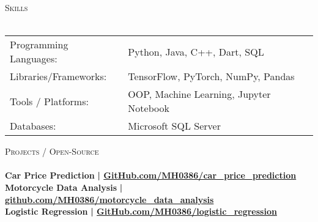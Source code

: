 \documentclass[a4paper]{article}
\newcommand{\lineunder} {
    \vspace*{-8pt} \\
    \hspace*{-18pt} \hrulefill \\
}
\newcommand{\header} [1] {
    {\hspace*{-18pt}\vspace*{6pt} \textsc{#1}}
    \vspace*{-6pt} \lineunder
}
\begin{document}
%
%
  \header{Skills}
  \vspace{2mm}
  \begin{longtable}{p{4cm}p{12cm}}
  Programming Languages: & Python, Java, C++, Dart, SQL \\
  Libraries/Frameworks: & TensorFlow, PyTorch, NumPy, Pandas \\
  Tools / Platforms: & OOP, Machine Learning, Jupyter Notebook \\
  Databases: & Microsoft SQL Server \\
  \end{longtable}
  \vspace{1mm}

      \header{Projects / Open-Source}
\vspace{2mm}
      {\textbf{Car Price Prediction}}\textbf{ | \href{https://github.com/MH0386/car\_price\_prediction}{GitHub.com/MH0386/car\_price\_prediction}}\\

\vspace*{3mm}
      {\textbf{Motorcycle Data Analysis}}\textbf{ | \href{https://github.com/MH0386/motorcycle\_data\_analysis}{github.com/MH0386/motorcycle\_data\_analysis}}\\

\vspace*{3mm}
      {\textbf{Logistic Regression}}\textbf{ | \href{https://github.com/MH0386/logistic\_regression}{GitHub.com/MH0386/logistic\_regression}}\\

\vspace*{3mm}
\end{document}
